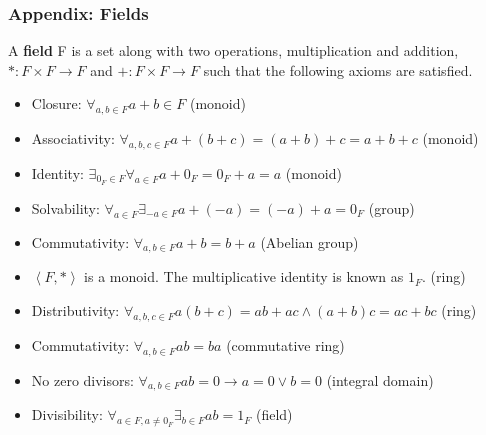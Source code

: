 \documentclass[10pt]{beamer}
\begin{document}
\begin{frame}
  \frametitle{Appendix: Fields}
  A \textbf{field} F is a set along with two operations, multiplication and addition, $*: F\times F\rightarrow F$ and $+: F\times F\rightarrow F$ such that the following axioms are satisfied.
  \begin{itemize}
  \item Closure: $\forall_{a,b\in F}a + b\in F$ (monoid)
  \item Associativity: $\forall_{a,b,c\in F} a + (b + c) = (a + b) + c = a + b + c$ (monoid)
  \item Identity: $\exists_{0_F\in F}\forall_{a\in F} a + 0_F = 0_F + a = a$ (monoid)
  \item Solvability: $\forall_{a\in F}\exists_{-a\in F}a + (-a) = (-a) + a = 0_F$ (group)
  \item Commutativity: $\forall_{a, b\in F} a + b = b + a$ (Abelian group)
  \item $\left<F, *\right>$ is a monoid. The multiplicative identity is known as $1_F$. (ring)
  \item Distributivity: $\forall_{a, b, c \in F}a (b + c) = ab + ac \wedge (a + b)c = ac + bc$ (ring)
    \item Commutativity: $\forall_{a, b\in F} ab = ba$ (commutative ring)
    \item No zero divisors: $\forall_{a, b\in F} ab = 0 \rightarrow a = 0 \vee b = 0$ (integral domain)
    \item Divisibility: $\forall_{a\in F, a \ne 0_F} \exists_{b\in F} ab = 1_F$ (field)
  \end{itemize}
\end{frame}
\end{document}
